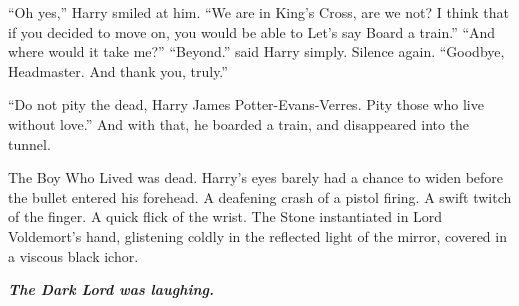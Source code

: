 “Oh yes,” Harry smiled at him. “We are in King’s Cross, are we not? I think that if you decided to move on, you would be able to{\el} Let’s say{\el} Board a train.”
\SmallVSpace
“And where would it take me?”
\SmallVSpace
“Beyond.” said Harry simply.
\SmallVSpace
Silence again.
\SmallVSpace
“Goodbye, Headmaster. And thank you, truly.”

“Do not pity the dead, Harry James Potter-Evans-Verres. Pity those who live without love.” And with that, he boarded a train, and disappeared into the tunnel.
\simpleline
{}

\begin{flushright}
The Boy Who Lived was dead.
\SmallVSpace
Harry’s eyes barely had a chance to widen before the bullet entered his forehead.
\SmallVSpace
A deafening crash of a pistol firing.
\SmallVSpace
A swift twitch of the finger.
\SmallVSpace
A quick flick of the wrist.
\SmallVSpace
The Stone instantiated in Lord Voldemort’s hand, glistening coldly in the reflected light of the mirror, covered in a viscous black ichor.
\end{flushright}
\simpleline

\textbf{\textit{The Dark Lord was laughing.}}